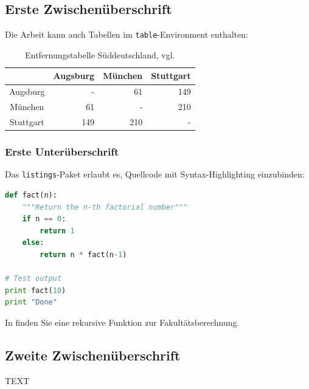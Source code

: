 \subsection{Erste Zwischenüberschrift}
\label{sec:ErsteZwischenueberschrift}
Die Arbeit kann auch Tabellen im \texttt{table}-Environment enthalten:
\begin{table}[ht]
  \centering
  \caption{Entfernungstabelle Süddeutschland, vgl. \cite{entfernungstabelle}}
  \begin{tabular}{c r r r}
    \toprule
              & Augsburg & München & Stuttgart \\
    \midrule
    Augsburg  & -        & 61      & 149       \\
    München   & 61       & -       & 210       \\
    Stuttgart & 149      & 210     & -         \\
    \bottomrule
  \end{tabular}
  \label{tab:entfernungen}
\end{table}

\subsubsection{Erste Unterüberschrift}
\label{sec:ErsteUnterueberschrift}

Das \texttt{listings}-Paket erlaubt es, Quellcode mit Syntax-Highlighting einzubinden:

\begin{lstlisting}[language=Python,float=ht,caption={Python-Programm zur Berechnung der Fakultätsfunktion},label=lst:factorial]
def fact(n):
    """Return the n-th factorial number"""
    if n == 0:
        return 1
    else:
        return n * fact(n-1)
  
# Test output
print fact(10)
print "Done"
\end{lstlisting}

In  finden Sie eine rekursive Funktion zur Fakultätsberechnung.
  
\subsection{Zweite Zwischenüberschrift}
\label{sec:ZweiteZwischenueberschrift}

TEXT

\printbibliography[heading=bibintoc]





